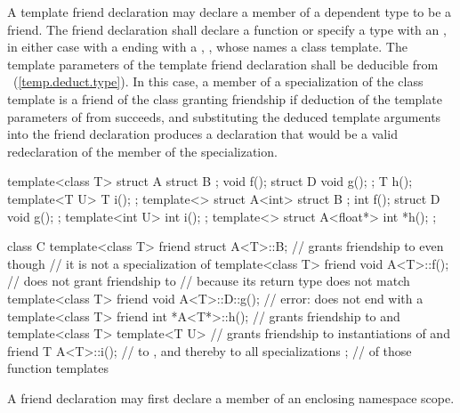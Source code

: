 \pnum
A template friend declaration may declare
a member of a dependent type to be a friend.
The friend declaration shall declare a function or
specify a type with an ,
in either case with a 
ending with a , ,
whose  names a class template.
The template parameters of the template friend declaration
shall be deducible from ~(\ref{temp.deduct.type}).
In this case,
a member of a specialization  of the class template
is a friend of the class granting friendship
if deduction of the template parameters
of  from  succeeds, and
substituting the deduced template arguments into the friend declaration
produces a declaration that would be a valid redeclaration
of the member of the specialization.
\begin{example}
\begin{codeblock}
template<class T> struct A {
  struct B { };
  void f();
  struct D {
    void g();
  };
  T h();
  template<T U> T i();
};
template<> struct A<int> {
  struct B { };
  int f();
  struct D {
    void g();
  };
  template<int U> int i();
};
template<> struct A<float*> {
  int *h();
};

class C {
  template<class T> friend struct A<T>::B;      // grants friendship to  even though
                                                // it is not a specialization of 
  template<class T> friend void A<T>::f();      // does not grant friendship to 
                                                // because its return type does not match
  template<class T> friend void A<T>::D::g();   // error:  does not end with a 
  template<class T> friend int *A<T*>::h();     // grants friendship to  and 
  template<class T> template<T U>               // grants friendship to instantiations of  and
    friend T A<T>::i();                         // to , and thereby to all specializations
};                                              // of those function templates
\end{codeblock}
\end{example}

\pnum
\begin{note}
A friend declaration may first declare a member of an enclosing namespace scope.
\end{note}

